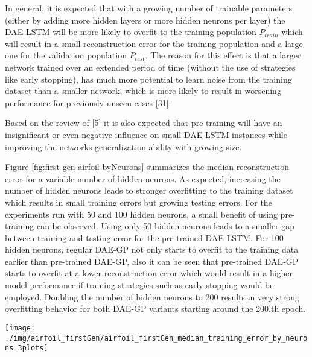 \documentclass[
  11pt,
]{article}
\let\origfigure\figure
\let\endorigfigure\endfigure
\renewenvironment{figure}[1][2] {
    \expandafter\origfigure\expandafter[H]
} {
    \endorigfigure
}
\begin{document}
In general, it is expected that with a growing number of trainable parameters (either by adding more hidden layers or more hidden neurons per layer) the DAE-LSTM will be more likely to overfit to the training population \(P_{train}\) which will result in a small reconstruction error for the training population and a large one for the validation population \(P_{test}\).
The reason for this effect is that a larger network trained over an extended period of time (without the use of strategies like early stopping), has much more potential to learn noise from the training dataset than a smaller network, which is more likely to result in worsening performance for previously unseen cases {[}\protect\hyperlink{ref-weigend1994overfitting}{31}{]}.

Based on the review of {[}\protect\hyperlink{ref-pmlr-v5-erhan09a}{5}{]} it is also expected that pre-training will have an insignificant or even negative influence on small DAE-LSTM instances while improving the networks generalization ability with growing size.

Figure \ref{fig:first-gen-airfoil-byNeurons} summarizes the median reconstruction error for a variable number of hidden neurons.
As expected, increasing the number of hidden neurons leads to stronger overfitting to the training dataset which results in small training errors but growing testing errors.
For the experiments run with 50 and 100 hidden neurons, a small benefit of using pre-training can be observed.
Using only 50 hidden neurons leads to a smaller gap between training and testing error for the pre-trained DAE-LSTM.
For 100 hidden neurons, regular DAE-GP not only starts to overfit to the training data earlier than pre-trained DAE-GP, also it can be seen that pre-trained DAE-GP starts to overfit at a lower reconstruction error which would result in a higher model performance if training strategies such as early stopping would be employed.
Doubling the number of hidden neurons to 200 results in very strong overfitting behavior for both DAE-GP variants starting around the 200.th epoch.

\begin{figure}[c]

{\centering \texttt{[image: ./img/airfoil\_firstGen/airfoil\_firstGen\_median\_training\_error\_by\_neurons\_3plots]} 

}

\caption{First Generation Median Reconstruction Error for variable number of hidden Neurons}\label{fig:first-gen-airfoil-byNeurons}
\end{figure}
\end{document}
